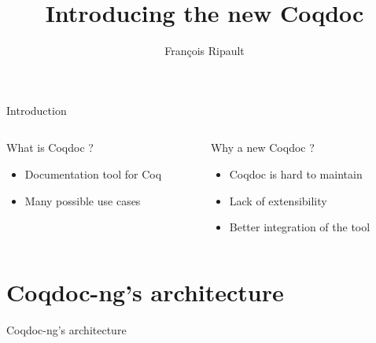 \documentclass[compress]{beamer}
\title{Introducing the new Coqdoc}
\author{François Ripault}
\begin{document}
\begin{frame}
\titlepage
\end{frame}

\begin{frame}{Introduction}
  \begin{columns}[2]
    \begin{column}{0.5\textwidth}
      What is Coqdoc ?
      \begin{itemize}
        \item Documentation tool for Coq
        \item Many possible use cases
      \end{itemize}
    \end{column}
    \begin{column}{0.5\textwidth}
      Why a new Coqdoc ?
      \begin{itemize}
        \item Coqdoc is hard to maintain
        \item Lack of extensibility
        \item Better integration of the tool
      \end{itemize}
    \end{column}
  \end{columns}
\end{frame}

\begin{frame}
    \tableofcontents
\end{frame}

\section{Coqdoc-ng's architecture}
  \begin{frame}{Coqdoc-ng's architecture}
    
  \end{frame}
\end{document}
